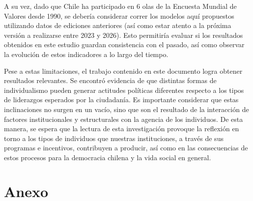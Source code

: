 \documentclass[12pt,twoside]{templates/facsothesis}
\begin{document}
A su vez, dado que Chile ha participado en 6 olas de la Encuesta Mundial de Valores desde 1990, se debería considerar correr los modelos aquí propuestos utilizando datos de ediciones anteriores (así como estar atento a la próxima versión a realizarse entre 2023 y 2026). Esto permitiría evaluar si los resultados obtenidos en este estudio guardan consistencia con el pasado, así como observar la evolución de estos indicadores a lo largo del tiempo.

Pese a estas limitaciones, el trabajo contenido en este documento logra obtener resultados relevantes. Se encontró evidencia de que distintas formas de individualismo pueden generar actitudes políticas diferentes respecto a los tipos de liderazgos esperados por la ciudadanía. Es importante considerar que estas inclinaciones no surgen en un vacío, sino que son el resultado de la interacción de factores institucionales y estructurales con la agencia de los individuos. De esta manera, se espera que la lectura de esta investigación provoque la reflexión en torno a los tipos de individuos que nuestras instituciones, a través de sus programas e incentivos, contribuyen a producir, así como en las consecuencias de estos procesos para la democracia chilena y la vida social en general.


\pagestyle{fancyplain}
\fancyhf{}
	 \fancyfoot[C]{\thepage}
{}




\hypertarget{Anexo}{%
\chapter*{Anexo}\label{Anexo}}
\end{document}
